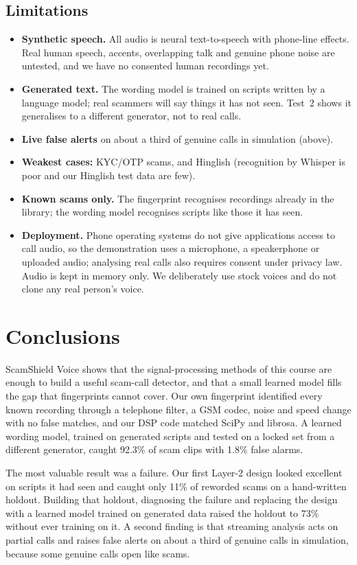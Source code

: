 \documentclass[letterpaper,12pt]{article}
\begin{document}
\subsection{Limitations}
\begin{itemize}
    \item \textbf{Synthetic speech.} All audio is neural text-to-speech with phone-line effects. Real human speech, accents, overlapping talk and genuine phone noise are untested, and we have no consented human recordings yet.
    \item \textbf{Generated text.} The wording model is trained on scripts written by a language model; real scammers will say things it has not seen. Test~2 shows it generalises to a different generator, not to real calls.
    \item \textbf{Live false alerts} on about a third of genuine calls in simulation (above).
    \item \textbf{Weakest cases:} KYC/OTP scams, and Hinglish (recognition by Whisper is poor and our Hinglish test data are few).
    \item \textbf{Known scams only.} The fingerprint recognises recordings already in the library; the wording model recognises scripts like those it has seen.
    \item \textbf{Deployment.} Phone operating systems do not give applications access to call audio, so the demonstration uses a microphone, a speakerphone or uploaded audio; analysing real calls also requires consent under privacy law. Audio is kept in memory only. We deliberately use stock voices and do not clone any real person's voice.
\end{itemize}

\section{Conclusions}\label{sec:conc}
ScamShield Voice shows that the signal-processing methods of this course are enough to build a useful scam-call detector, and that a small learned model fills the gap that fingerprints cannot cover. Our own fingerprint identified every known recording through a telephone filter, a GSM codec, noise and speed change with no false matches, and our DSP code matched SciPy and librosa. A learned wording model, trained on generated scripts and tested on a locked set from a different generator, caught 92.3\% of scam clips with 1.8\% false alarms.

The most valuable result was a failure. Our first Layer-2 design looked excellent on scripts it had seen and caught only 11\% of reworded scams on a hand-written holdout. Building that holdout, diagnosing the failure and replacing the design with a learned model trained on generated data raised the holdout to 73\% without ever training on it. A second finding is that streaming analysis acts on partial calls and raises false alerts on about a third of genuine calls in simulation, because some genuine calls open like scams.
\end{document}
